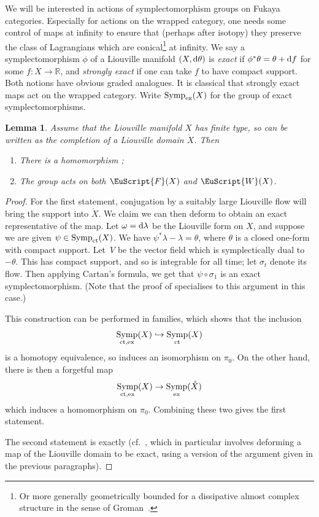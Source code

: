 \documentclass[10pt,a4paper]{amsart}
\newcommand{\scrF}{\EuScript{F}}
\def\scrW{\EuScript{W}}
\DeclareMathOperator{\Symp}{Symp}
\def\bR{\mathbb{R}}
\newtheorem{lem}[thm]{Lemma}
\theoremstyle{definition}
\numberwithin{equation}{section}
\begin{document}
We will be interested in actions of symplectomorphism groups on Fukaya categories. Especially for actions on the wrapped category, one needs some control of maps at infinity to ensure that (perhaps after isotopy) they preserve the class of Lagrangians which are conical\footnote{Or more generally geometrically bounded for a dissipative almost complex structure in the sense of Groman~\cite{Groman}.} at infinity. We say a symplectomorphism $\phi$ of a Liouville manifold $(X,{\rm d}\theta)$ is \emph{exact} if $\phi^*\theta = \theta + {\rm d}f$ for some $f\colon X \to \bR$, and \emph{strongly exact} if one can take $f$ to have compact support. Both notions have obvious graded analogues. It is classical that strongly exact maps act on the wrapped category. Write $\Symp_{\rm ex}(X)$ for the group of exact symplectomorphisms.

\begin{lem}\label{lem:acts}
 Assume that the Liouville manifold $X$ has finite type, so can be written as the completion of a Liouville domain $\mathring{X}$. Then
 \begin{enumerate}\itemsep=0pt
 \item[$(1)$] There is a homomorphism \smash{$\pi_0\Symp_{\rm ct}(X) \to \pi_0\Symp_{\rm ex}\bigl(\mathring{X}\bigr)$};
 \item[$(2)$] The group \smash{$\pi_0\Symp\bigl(\mathring{X}\bigr)$} acts on both $\scrF(X)$ and $\scrW(X)$.
 \end{enumerate}
\end{lem}

\begin{proof}
 For the first statement, conjugation by a suitably large Liouville flow will bring the support into $\mathring{X}$. We claim we can then deform to obtain an exact representative of the map. Let $\omega = {\rm d} \lambda$ be the Liouville form on $X$, and suppose we are given $\psi \in \Symp_{\rm ct} (X)$. We have $\psi^\ast \lambda - \lambda = \theta$, where $\theta$ is a closed one-form with compact support. Let~$V$ be the vector field which is symplectically dual to $-\theta$. This has compact support, and so is integrable for all time; let $\sigma_t$ denote its flow. Then applying Cartan's formula, we get that $\psi \circ \sigma_1 $ is an exact symplectomorphism. (Note that the proof of \cite[Lemma~1.1]{BEE} specialises to this argument in this case.)

 This construction can be performed in families, which shows that the inclusion
 \[
 \Symp_{\rm ct,ex}(X) \hookrightarrow \Symp_{\rm ct}(X)
 \]
 is a homotopy equivalence, so induces an isomorphism on $\pi_0$. On the other hand, there is then a forgetful map
 \[
 \Symp_{\rm ct,ex}(X) \to \Symp_{\rm ex}(\mathring{X})
 \]
 which induces a homomorphism on $\pi_0$. Combining these two gives the first statement.

 The second statement is exactly \cite[Corollary~2.4]{Keating-Smith} (cf.~\cite{KS:corr}, which in particular involves deforming a map of the Liouville domain to be exact, using a version of the argument given in the previous paragraphs).
\end{proof}
\end{document}
